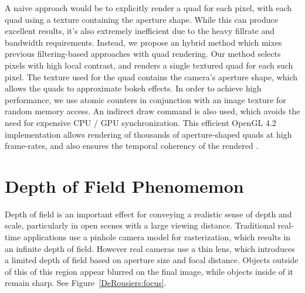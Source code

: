 A naive approach would be to explicitly render a quad for each pixel, with each quad using a texture containing the aperture shape. While this can produce excellent results, it's also extremely inefficient due to the heavy fillrate and bandwidth requirements. Instead, we propose an hybrid method which mixes previous filtering-based approaches with quad rendering. Our method selects pixels with high local contrast, and renders a single textured quad for each such pixel. The texture used for the quad contains the camera's aperture shape, which allows the quads to approximate bokeh effects. In order to achieve high performance, we use atomic counters in conjunction with an image texture for random memory access. An indirect draw command is also used, which avoids the need for expensive CPU / GPU synchronization. This efficient OpenGL 4.2 implementation allows rendering of thousands of aperture-shaped quads at high frame-rates, and also ensures the temporal coherency of the rendered \bokeh.

\section{Depth of Field Phenomemon}\label{Derousiers:DOFPhenomenon}
Depth of field is an important effect for conveying a realistic sense of depth and scale, particularly in open scenes with a large viewing distance. Traditional real-time applications use a pinhole camera model for rasterization, which results in an infinite depth of field. However real cameras use a thin lens, which introduces a limited depth of field based on aperture size and focal distance. Objects outside of this of this region appear blurred on the final image, while objects inside of it remain sharp. See Figure~\ref{DeRousiers:focus}.

